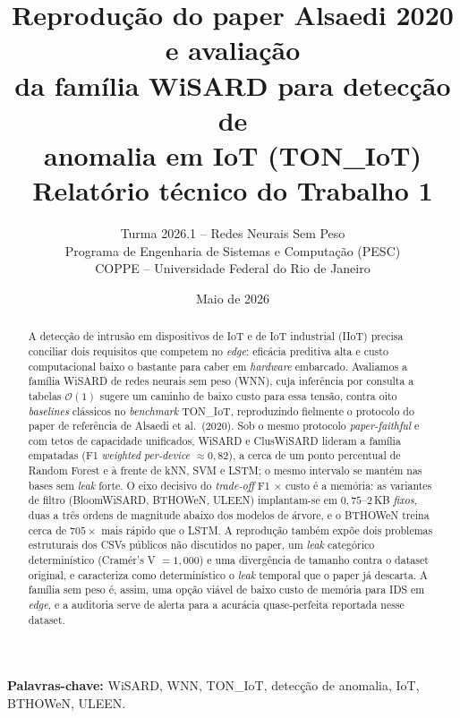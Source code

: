 \documentclass[11pt,a4paper]{article}
\title{
  \vspace{-1.5cm}
  Reprodução do paper Alsaedi 2020 e avaliação\\
  da família WiSARD para detecção de\\
  anomalia em IoT (TON\_IoT) \\[0.5em]
  \large Relatório técnico do Trabalho 1
}
\author{Turma 2026.1 -- Redes Neurais Sem Peso \\
        Programa de Engenharia de Sistemas e Computação (PESC) \\
        COPPE -- Universidade Federal do Rio de Janeiro}
\date{Maio de 2026}
\begin{document}
\maketitle
\thispagestyle{empty}

\begin{abstract}
\noindent
A detecção de intrusão em dispositivos de IoT e de IoT industrial
(IIoT) precisa conciliar dois
requisitos que competem no \emph{edge}: eficácia preditiva alta e custo
computacional baixo o bastante para caber em \emph{hardware} embarcado.
Avaliamos a família WiSARD de redes neurais sem peso (WNN), cuja
inferência por consulta a tabelas $\mathcal{O}(1)$ sugere um caminho de
baixo custo para essa tensão, contra oito \emph{baselines} clássicos no
\emph{benchmark} TON\_IoT, reproduzindo fielmente o protocolo do paper
de referência de Alsaedi et al.\ (2020). Sob o mesmo protocolo
\emph{paper-faithful} e com tetos de capacidade unificados, WiSARD e
ClusWiSARD lideram a família empatadas (F1 \emph{weighted}
\emph{per-device} $\approx 0{,}82$), a cerca de um ponto percentual de
Random Forest e à frente de kNN, SVM e LSTM; o mesmo intervalo se mantém
nas bases sem \emph{leak} forte. O eixo decisivo do \emph{trade-off}
F1 $\times$ custo é a memória: as variantes de filtro (BloomWiSARD,
BTHOWeN, ULEEN) implantam-se em $0{,}75$--$2$\,KB \emph{fixos}, duas a
três ordens de magnitude abaixo dos modelos de árvore, e o BTHOWeN
treina cerca de $705\times$ mais rápido que o LSTM. A reprodução também
expõe dois problemas estruturais dos CSVs públicos não discutidos no
paper, um \emph{leak} categórico determinístico (Cramér's V $=1{,}000$)
e uma divergência de tamanho contra o dataset original, e caracteriza
como determinístico o \emph{leak} temporal que o paper já descarta. A
família sem peso é, assim, uma opção viável de baixo custo de memória
para IDS em \emph{edge}, e a auditoria serve de alerta para a acurácia
quase-perfeita reportada nesse dataset.
\end{abstract}

\vspace{0.5em}
\noindent\textbf{Palavras-chave:} WiSARD, WNN, TON\_IoT, detecção de
anomalia, IoT, BTHOWeN, ULEEN.

\vspace{1em}


\FloatBarrier

\FloatBarrier

\FloatBarrier

\FloatBarrier

\FloatBarrier

\FloatBarrier

\FloatBarrier

\FloatBarrier


\FloatBarrier
\clearpage



\end{document}
